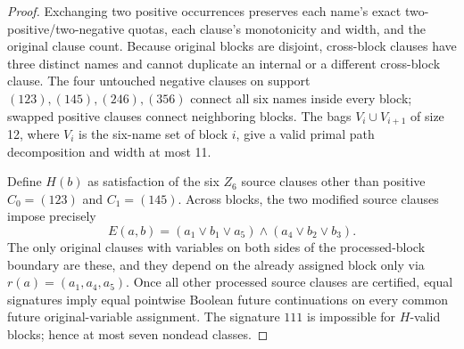 \documentclass[11pt]{article}
\begin{document}
\begin{proof}
Exchanging two positive occurrences preserves each name's exact two-positive/two-negative quotas, each clause's monotonicity and width, and the original clause count. Because original blocks are disjoint, cross-block clauses have three distinct names and cannot duplicate an internal or a different cross-block clause. The four untouched negative clauses on support $(123),(145),(246),(356)$ connect all six names inside every block; swapped positive clauses connect neighboring blocks. The bags $V_i\cup V_{i+1}$ of size 12, where $V_i$ is the six-name set of block $i$, give a valid primal path decomposition and width at most 11.

Define $H(b)$ as satisfaction of the six $Z_6$ source clauses other than positive $C_0=(123)$ and $C_1=(145)$. Across blocks, the two modified source clauses impose precisely
\[
E(a,b)=(a_1\vee b_1\vee a_5)\land(a_4\vee b_2\vee b_3).
\]
The only original clauses with variables on both sides of the processed-block boundary are these, and they depend on the already assigned block only via $r(a)=(a_1,a_4,a_5)$. Once all other processed source clauses are certified, equal signatures imply equal pointwise Boolean future continuations on every common future original-variable assignment. The signature $111$ is impossible for $H$-valid blocks; hence at most seven nondead classes.


\end{proof}
\end{document}

